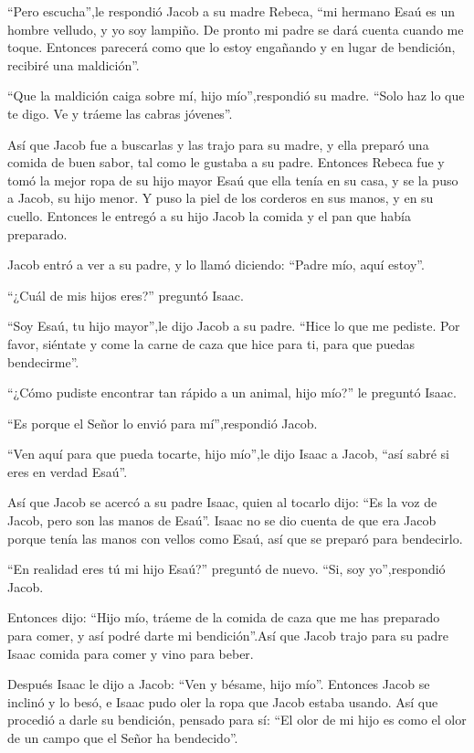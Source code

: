  ``Pero escucha'',le respondió Jacob a su madre Rebeca,
``mi hermano Esaú es un hombre velludo, y yo soy lampiño. 
De pronto mi padre se dará cuenta cuando me toque. Entonces parecerá
como que lo estoy engañando y en lugar de bendición, recibiré una
maldición''.

 ``Que la maldición caiga sobre mí, hijo mío'',respondió su
madre. ``Solo haz lo que te digo. Ve y tráeme las cabras jóvenes''.

 Así que Jacob fue a buscarlas y las trajo para su madre, y
ella preparó una comida de buen sabor, tal como le gustaba a su padre.
 Entonces Rebeca fue y tomó la mejor ropa de su hijo mayor
Esaú que ella tenía en su casa, y se la puso a Jacob, su hijo menor.
 Y puso la piel de los corderos en sus manos, y en su
cuello.  Entonces le entregó a su hijo Jacob la comida y el
pan que había preparado.

 Jacob entró a ver a su padre, y lo llamó diciendo: ``Padre
mío, aquí estoy''.

``¿Cuál de mis hijos eres?'' preguntó Isaac.

 ``Soy Esaú, tu hijo mayor'',le dijo Jacob a su padre.
``Hice lo que me pediste. Por favor, siéntate y come la carne de caza
que hice para ti, para que puedas bendecirme''.

 ``¿Cómo pudiste encontrar tan rápido a un animal, hijo
mío?'' le preguntó Isaac.

``Es porque el Señor lo envió para mí'',respondió Jacob.

 ``Ven aquí para que pueda tocarte, hijo mío'',le dijo
Isaac a Jacob, ``así sabré si eres en verdad Esaú''.

 Así que Jacob se acercó a su padre Isaac, quien al tocarlo
dijo: ``Es la voz de Jacob, pero son las manos de Esaú''. 
Isaac no se dio cuenta de que era Jacob porque tenía las manos con
vellos como Esaú, así que se preparó para bendecirlo.

 ``En realidad eres tú mi hijo Esaú?'' preguntó de nuevo.
``Si, soy yo'',respondió Jacob.

 Entonces dijo: ``Hijo mío, tráeme de la comida de caza que
me has preparado para comer, y así podré darte mi bendición''.Así que
Jacob trajo para su padre Isaac comida para comer y vino para beber.

 Después Isaac le dijo a Jacob: ``Ven y bésame, hijo mío''.
 Entonces Jacob se inclinó y lo besó, e Isaac pudo oler la
ropa que Jacob estaba usando. Así que procedió a darle su bendición,
pensado para sí: ``El olor de mi hijo es como el olor de un campo que el
Señor ha bendecido''.


